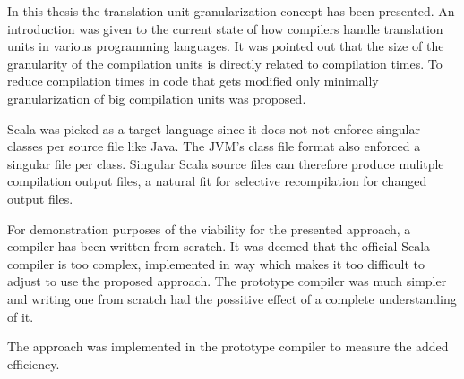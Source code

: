 \documentclass{VUMIFPSbakalaurinis}
\begin{document}
\begin{figure}
\end{figure}


In this thesis the translation unit granularization concept has been presented.
An introduction was given to the current state of how compilers handle translation units in various programming languages.
It was pointed out that the size of the granularity of the compilation units is directly related to compilation times.
To reduce compilation times in code that gets modified only minimally granularization of big compilation units was proposed.

Scala was picked as a target language since it does not not enforce singular classes per source file like Java.
The JVM's class file format also enforced a singular file per class.
Singular Scala source files can therefore produce mulitple compilation output files, a natural fit for selective recompilation for changed output files.

For demonstration purposes of the viability for the presented approach, a compiler has been written from scratch.
It was deemed that the official Scala compiler is too complex, implemented in way which makes it too difficult to adjust to use the proposed approach.
The prototype compiler was much simpler and writing one from scratch had the possitive effect of a complete understanding of it.

The approach was implemented in the prototype compiler to measure the added efficiency.

\end{document}
